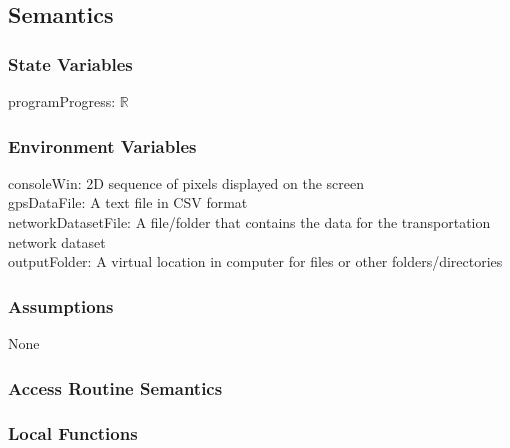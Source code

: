 \documentclass[12pt, titlepage]{article}
\begin{document}
\subsection{Semantics}

\subsubsection{State Variables}
programProgress: $\mathbb{R}$

\subsubsection{Environment Variables}
consoleWin: 2D sequence of pixels displayed on the screen\\
gpsDataFile: A text file in CSV format\\
networkDatasetFile: A file/folder that contains the data for the transportation network dataset\\
outputFolder: A virtual location in computer for files or other folders/directories\\

\subsubsection{Assumptions} None

\subsubsection{Access Routine Semantics}



\subsubsection{Local Functions}
\end{document}
